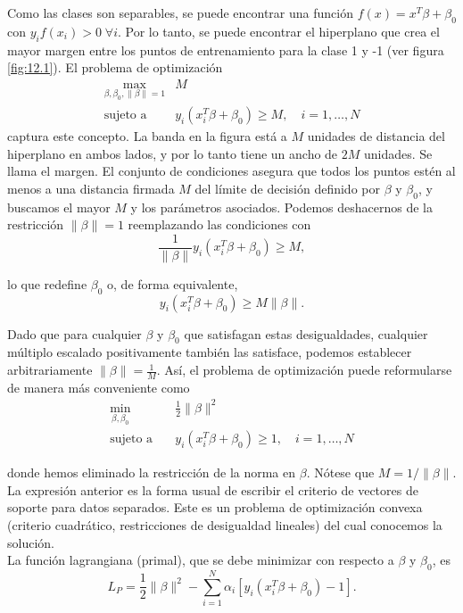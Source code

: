 Como las clases son separables, se puede encontrar una función $f(x) = x^T\beta + \beta_0$ con $y_i f(x_i) > 0 \; \forall i$. Por lo tanto, se puede encontrar el hiperplano que crea el mayor margen entre los puntos de entrenamiento para la clase 1 y -1 (ver figura \ref{fig:12.1}). El problema de optimización 
\begin{align}
\max_{\beta, \beta_0, \|\beta\|=1} & M \\
\text{sujeto a} \quad & y_i (x_i^T \beta + \beta_0) \geq M, \quad i = 1, \ldots, N
\end{align}
captura este concepto. La banda en la figura está a $M$ unidades de distancia del hiperplano en ambos lados, y por lo tanto tiene un ancho de $2M$ unidades. Se llama el margen. El conjunto de condiciones asegura que todos los puntos estén al menos a una distancia firmada $M$ del límite de decisión definido por $\beta$ y $\beta_0$, y buscamos el mayor $M$ y los parámetros asociados. Podemos deshacernos de la restricción $\|\beta\| = 1$ reemplazando las condiciones con
\begin{equation}
\frac{1}{\|\beta\|} y_i (x_i^T \beta + \beta_0) \geq M,
\end{equation}

\noindent lo que redefine $\beta_0$ o, de forma equivalente,
\begin{equation}
y_i (x_i^T \beta + \beta_0) \geq M \|\beta\|.
\end{equation}

Dado que para cualquier $\beta$ y $\beta_0$ que satisfagan estas desigualdades, cualquier múltiplo escalado positivamente también las satisface, podemos establecer arbitrariamente $\|\beta\| = \frac{1}{M}$. Así, el problema de optimización puede reformularse de manera más conveniente como
\begin{align}
\min_{\beta, \beta_0} & \frac{1}{2} \|\beta\|^2 \\
\text{sujeto a} \quad & y_i (x_i^T \beta + \beta_0) \geq 1, \quad i = 1, \ldots, N
\end{align}

\noindent donde hemos eliminado la restricción de la norma en $\beta$. Nótese que $M = 1/\|\beta\|$. La expresión anterior es la forma usual de escribir el criterio de vectores de soporte para datos separados. Este es un problema de optimización convexa (criterio cuadrático, restricciones de desigualdad lineales) del cual conocemos la solución. \\

\noindent La función lagrangiana (primal), que se debe minimizar con respecto a $\beta$ y $\beta_0$, es
\begin{equation}
L_P = \frac{1}{2} \|\beta\|^2 - \sum_{i=1}^N \alpha_i [y_i (x_i^T \beta + \beta_0) - 1].
\end{equation}

